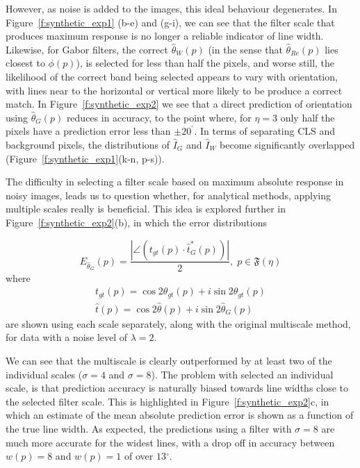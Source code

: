\documentclass{IEEEtran}
\newcommand{\fref}[1]{Figure~\ref{#1}}
\def\deg{\ensuremath{^\circ}}
\begin{document}
However, as noise is added to the images, this ideal behaviour degenerates. In \fref{f:synthetic_exp1} (b-e) and (g-i), we can see that the filter scale that produces maximum response is no longer a reliable indicator of line width. Likewise, for Gabor filters, the correct $\hat{\theta}_{W}(p)$ (in the sense that $\hat{\theta}_{Re}(p)$ lies closest to $\phi(p)$), is selected for less than half the pixels, and worse still, the likelihood of the correct band being selected appears to vary with orientation, with lines near to the horizontal or vertical more likely to be produce a correct match. In \fref{f:synthetic_exp2} we see that a direct prediction of orientation using $\hat{\theta}_{G}(p)$ reduces in accuracy, to the point where, for $\eta=3$ only half the pixels have a prediction error less than $\pm20^{\deg}$. In terms of separating CLS and background pixels, the distributions of $\hat{I}_{G}$ and $\hat{I}_{W}$ become significantly overlapped (\fref{f:synthetic_exp1}(k-n, p-s)).

The difficulty in selecting a filter scale based on maximum absolute response in noisy images, leads us to question whether, for analytical methods, applying multiple scales really is beneficial. This idea is explored further in \fref{f:synthetic_exp2}(b), in which the error distributions

\begin{equation}
E_{\hat{\theta}_{G}}(p) = \frac{|\angle(t_{gt}(p) \cdot \hat{t}_{G}^*(p))|}{2}, \; p \in \mathfrak{F}(\eta)
\end{equation}
%
where
%
\begin{align}
t_{gt}(p) = \cos2\theta_{gt}(p) + i\sin2\theta_{gt}(p) \\
\hat{t}(p) = \cos2\hat{\theta}(p) + i\sin2\hat{\theta}_{G}(p)
\end{align}
%
are shown using each scale separately, along with the original multiscale method, for data with a noise level of $\lambda = 2$.

We can see that the multiscale is clearly outperformed by at least two of the individual scales ($\sigma=4$ and $\sigma=8$). The problem with selected an individual scale, is that prediction accuracy is naturally biased towards line widths close to the selected filter scale. This is highlighted in \fref{f:synthetic_exp2}c, in which an estimate of the mean absolute prediction error is shown as a function of the true line width. As expected, the predictions using a filter with $\sigma=8$ are much more accurate for the widest lines, with a drop off in accuracy between $w(p) = 8$ and $w(p) = 1$ of over $13\deg$.
\end{document}
